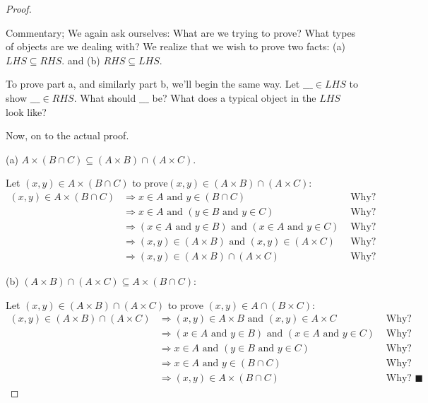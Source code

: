 \documentclass[10pt,]{book}
\theoremstyle{plain}
\theoremstyle{definition}
\theoremstyle{definition}
\theoremstyle{definition}
\begin{document}
\begin{proof}\hypertarget{proof-2}{}
Commentary; We again ask ourselves: What are we trying to prove? What types of objects are we dealing with? We realize that we wish to prove two facts: (a) \(LHS\subseteq RHS\). and (b) \(RHS\subseteq LHS\).%
\par
To prove part a, and similarly part b, we'll begin the same way. Let  \(\_\_\_ \in  LHS\) to show \(\_\_\_ \in  RHS\). What should \(\_\_\_\) be?  What does a typical object in the \(LHS\) look like?%
\par
Now, on to the actual proof.%
\par
(a) \(A\times (B\cap  C)\subseteq (A\times B)\cap (A\times C)\).%
\par
Let \((x, y) \in  A\times (B\cap C)\) to prove\((x, y) \in  (A\times B)\cap (A\times C)\):
\begin{equation*}
\begin{split}
(x, y) \in A\times (B\cap C) &\Rightarrow x \in  A \textrm{ and } y \in  (B\cap  C)&\textrm{ Why? }\\
	&\Rightarrow x \in  A \textrm{ and }(y \in  B\textrm{ and } y \in  C)&\textrm{ Why? }\\
	 &\Rightarrow (x \in  A \textrm{ and } y \in  B) \textrm{ and } (x \in  A \textrm{ and } y \in C)&\textrm{ Why? }\\
	  &\Rightarrow  (x, y) \in  (A\times B) \textrm{ and } (x, y) \in  (A \times C)&\textrm{ Why? }\\
	   &\Rightarrow (x, y) \in  (A\times  B) \cap (A\times C)&\textrm{ Why? }
 \end{split}
 \end{equation*}
%
\par
(b) \((A\times  B)\cap (A\times C)\subseteq A\times ( B\cap C)\):

Let \((x, y) \in  (A\times  B) \cap  (A\times C)\) to prove \((x, y) \in  A \cap  ( B\times C)\):
\begin{equation*}
\begin{split}
(x, y) \in  (A\times  B)\cap (A\times C) &\Rightarrow (x, y) \in  A\times  B\textrm{ and } (x, y) \in  A\times C&\textrm{ Why? }\\
 &\Rightarrow (x \in  A \textrm{ and } y \in  B) \textrm{ and } (x \in  A \textrm{ and } y \in  C)&\textrm{ Why? }\\
  &\Rightarrow  x \in  A \textrm{ and } (y \in  B\textrm{ and } y \in  C)&\textrm{ Why? }\\
  &\Rightarrow  x \in  A\textrm{ and } y \in  (B\cap  C)&\textrm{ Why? }\\
   &\Rightarrow (x, y) \in  A \times (B\cap  C)&\textrm{ Why? }  \blacksquare
 \end{split}
 \end{equation*}
%
\end{proof}
\typeout{************************************************}
\typeout{************************************************}
\end{document}
